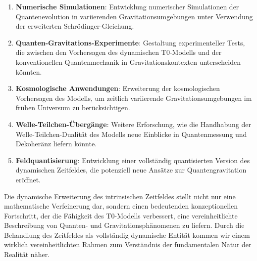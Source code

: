 \documentclass[12pt,a4paper]{article}
\begin{document}
	\begin{enumerate}
		\item \textbf{Numerische Simulationen}: Entwicklung numerischer Simulationen der Quantenevolution in variierenden Gravitationsumgebungen unter Verwendung der erweiterten Schrödinger-Gleichung.
		
		\item \textbf{Quanten-Gravitations-Experimente}: Gestaltung experimenteller Tests, die zwischen den Vorhersagen des dynamischen T0-Modells und der konventionellen Quantenmechanik in Gravitationskontexten unterscheiden könnten.
		
		\item \textbf{Kosmologische Anwendungen}: Erweiterung der kosmologischen Vorhersagen des Modells, um zeitlich variierende Gravitationsumgebungen im frühen Universum zu berücksichtigen.
		
		\item \textbf{Welle-Teilchen-Übergänge}: Weitere Erforschung, wie die Handhabung der Welle-Teilchen-Dualität des Modells neue Einblicke in Quantenmessung und Dekoheränz liefern könnte.
		
		\item \textbf{Feldquantisierung}: Entwicklung einer vollständig quantisierten Version des dynamischen Zeitfeldes, die potenziell neue Ansätze zur Quantengravitation eröffnet.
	\end{enumerate}
	
	Die dynamische Erweiterung des intrinsischen Zeitfeldes stellt nicht nur eine mathematische Verfeinerung dar, sondern einen bedeutenden konzeptionellen Fortschritt, der die Fähigkeit des T0-Modells verbessert, eine vereinheitlichte Beschreibung von Quanten- und Gravitationsphänomenen zu liefern. Durch die Behandlung des Zeitfeldes als vollständig dynamische Entität kommen wir einem wirklich vereinheitlichten Rahmen zum Verständnis der fundamentalen Natur der Realität näher.
	
\end{document}

